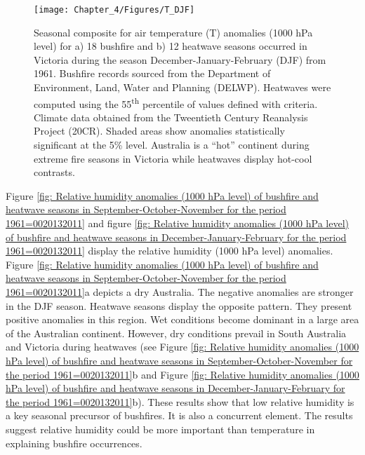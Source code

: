 \begin{figure}[h]
\noindent \begin{centering}
\texttt{[image: Chapter\_4/Figures/T\_DJF]}
\par\end{centering}

\caption[Seasonal composite for air temperature (T) anomalies (1000 hPa level)
for a) 18 bushfire and b) 12 heatwave seasons occurred in Victoria during the season
December-January-February (DJF) from 1961]{Seasonal composite for air temperature (T) anomalies (1000 hPa level)
for a) 18 bushfire and b) 12 heatwave seasons occurred in Victoria during the season
December-January-February (DJF) from 1961. Bushfire
records sourced from the Department of Environment, Land, Water and
Planning (DELWP). Heatwaves were computed using the 55\protect\textsuperscript{th}
percentile of values defined with \citet{Nairn2009} criteria. Climate
data obtained from the Tweentieth Century Reanalysis Project (20CR).
Shaded areas show anomalies statistically significant at the 5\% level.
Australia is a ``hot'' continent during extreme fire seasons in
Victoria while heatwaves display hot-cool contrasts. \label{fig:Temperature anomalies (1000 hPa level) of bushfire and heatwave seasons in December-January-February for the period 1961=0020132011}}
\end{figure}


Figure \ref{fig: Relative humidity anomalies (1000 hPa level) of bushfire and heatwave seasons in September-October-November for the period 1961=0020132011}
and figure \ref{fig: Relative humidity anomalies (1000 hPa level) of bushfire and heatwave seasons in December-January-February for the period 1961=0020132011}
display the relative humidity (1000 hPa level) anomalies. Figure \ref{fig: Relative humidity anomalies (1000 hPa level) of bushfire and heatwave seasons in September-October-November for the period 1961=0020132011}a
depicts a dry Australia. The negative anomalies are stronger in the
DJF season. Heatwave seasons display the opposite pattern. They present
positive anomalies in this region. Wet conditions become dominant
in a large area of the Australian continent. However, dry conditions
prevail in South Australia and Victoria during heatwaves (see Figure
\ref{fig: Relative humidity anomalies (1000 hPa level) of bushfire and heatwave seasons in September-October-November for the period 1961=0020132011}b
and Figure \ref{fig: Relative humidity anomalies (1000 hPa level) of bushfire and heatwave seasons in December-January-February for the period 1961=0020132011}b).
These results show that low relative humidity is a key seasonal precursor
of bushfires. It is also a concurrent element. The results suggest
relative humidity could be more important than temperature in explaining
bushfire occurrences. 

